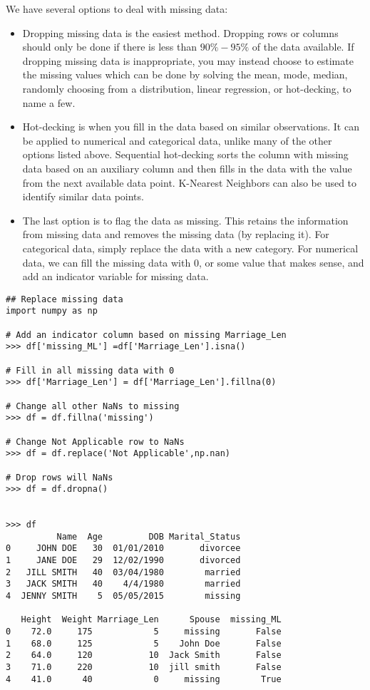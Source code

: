 \noindent We have several options to deal with missing data: 
\begin{itemize}
\item Dropping missing data is the easiest method.
Dropping rows or columns should only be done if there is less than $90\%-95\%$ of the data available.
If dropping missing data is inappropriate, you may instead choose to estimate the missing values which can be done by solving the mean, mode, median, randomly choosing from a distribution, linear regression, or hot-decking, to name a few.

\item Hot-decking is when you fill in the data based on similar observations.
It can be applied to numerical and categorical data, unlike many of the other options listed above.
Sequential hot-decking sorts the column with missing data based on an auxiliary column and then fills in the data with the value from the next available data point. K-Nearest Neighbors can also be used to identify similar data points.

\item The last option is to flag the data as missing. 
This retains the information from missing data and removes the missing data (by replacing it).
For categorical data, simply replace the data with a new category.
For numerical data, we can fill the missing data with $0$, or some value that makes sense, and add an indicator variable for missing data.
\end{itemize}

\begin{lstlisting}
## Replace missing data
import numpy as np

# Add an indicator column based on missing Marriage_Len
>>> df['missing_ML'] =df['Marriage_Len'].isna()

# Fill in all missing data with 0
>>> df['Marriage_Len'] = df['Marriage_Len'].fillna(0)

# Change all other NaNs to missing
>>> df = df.fillna('missing')

# Change Not Applicable row to NaNs
>>> df = df.replace('Not Applicable',np.nan)

# Drop rows will NaNs
>>> df = df.dropna()


>>> df
          Name  Age         DOB Marital_Status
0     JOHN DOE   30  01/01/2010       divorcee
1     JANE DOE   29  12/02/1990       divorced
2   JILL SMITH   40  03/04/1980        married
3   JACK SMITH   40    4/4/1980        married
4  JENNY SMITH    5  05/05/2015        missing

   Height  Weight Marriage_Len      Spouse  missing_ML
0    72.0     175            5     missing       False
1    68.0     125            5    John Doe       False
2    64.0     120           10  Jack Smith       False
3    71.0     220           10  jill smith       False
4    41.0      40            0     missing        True
\end{lstlisting}


